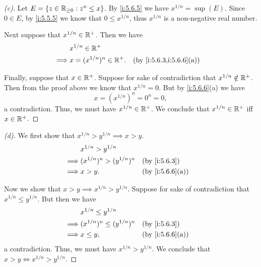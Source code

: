 \begin{proof}[(c)]
  Let \(E = \left\lbrace z \in \mathbb{R}_{\geq 0} : z^n \leq x\right\rbrace\).
  By \cref{i:5.6.5} we have \(x^{1 / n} = \sup(E)\).
  Since \(0 \in E\), by \cref{i:5.5.5} we know that \(0 \leq x^{1 / n}\), thus \(x^{1 / n}\) is a non-negative real number.

  Next suppose that \(x^{1 / n} \in \mathbb{R}^+\).
  Then we have
  \begin{align*}
             & x^{1 / n} \in \R^+                                       \\
    \implies & x = (x^{1 / n})^n \in \R^+. &  & \by{i:5.6.3,i:5.6.6}[a]
  \end{align*}

  Finally, suppose that \(x \in \mathbb{R}^+\).
  Suppose for sake of contradiction that \(x^{1 / n} \notin \mathbb{R}^+\).
  Then from the proof above we know that \(x^{1 / n} = 0\).
  But by \cref{i:5.6.6}(a) we have
  \[
    x = (x^{1 / n})^n = 0^n = 0,
  \]
  a contradiction.
  Thus, we must have \(x^{1 / n} \in \mathbb{R}^+\).
  We conclude that \(x^{1 / n} \in \mathbb{R}^+\) iff \(x \in \mathbb{R}^+\).
\end{proof}

\begin{proof}[(d)]
  We first show that \(x^{1 / n} > y^{1 / n} \implies x > y\).
  \begin{align*}
             & x^{1 / n} > y^{1 / n}                              \\
    \implies & (x^{1 / n})^n > (y^{1 / n})^n &  & \by{i:5.6.3}    \\
    \implies & x > y.                        &  & \by{i:5.6.6}[a]
  \end{align*}

  Now we show that \(x > y \implies x^{1 / n} > y^{1 / n}\).
  Suppose for sake of contradiction that \(x^{1 / n} \leq y^{1 / n}\).
  But then we have
  \begin{align*}
             & x^{1 / n} \leq y^{1 / n}                              \\
    \implies & (x^{1 / n})^n \leq (y^{1 / n})^n &  & \by{i:5.6.3}    \\
    \implies & x \leq y,                        &  & \by{i:5.6.6}[a]
  \end{align*}
  a contradiction.
  Thus, we must have \(x^{1 / n} > y^{1 / n}\).
  We conclude that \(x > y \iff x^{1 / n} > y^{1 / n}\).
\end{proof}

